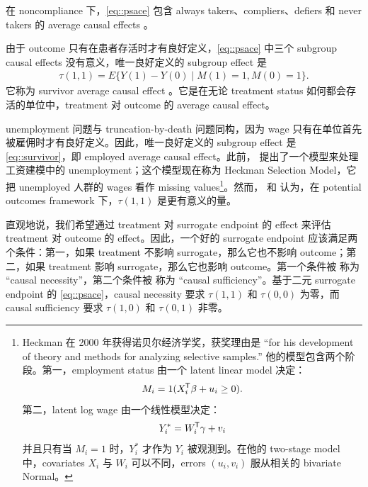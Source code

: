  

\setcounter{example}{0}
\begin{example}[noncompliance]
在 noncompliance 下，\cref{eq::psace} 包含 always takers、compliers、defiers 和 never takers 的 average causal effects \citep{imbens1994identification, angrist1996identification}。
\end{example}



\begin{example}
由于 outcome 只有在患者存活时才有良好定义，\cref{eq::psace} 中三个 subgroup causal effects 没有意义，唯一良好定义的 subgroup effect 是
\begin{eqnarray}
\label{eq::survivor}
\tau(1,1) = E\{  Y(1) - Y(0) \mid M(1) = 1, M(0) =1\} .
\end{eqnarray}
它称为 survivor average causal effect \citep{rubin2006causal}。它是在无论 treatment status 如何都会存活的单位中，treatment 对 outcome 的 average causal effect。
\end{example}



\begin{example}[unemployment]
unemployment 问题与 truncation-by-death 问题同构，因为 wage 只有在单位首先被雇佣时才有良好定义。因此，唯一良好定义的 subgroup effect 是 \cref{eq::survivor}，即 employed average causal effect。此前，\citet{heckman1979sample} 提出了一个模型来处理工资建模中的 unemployment；这个模型现在称为 Heckman Selection Model，它把 unemployed 人群的 wages 看作 missing values\footnote{Heckman 在 2000 年获得诺贝尔经济学奖，获奖理由是 ``for his development of theory and methods for analyzing selective samples.''
他的模型包含两个阶段。第一，employment status 由一个 latent linear model 决定：
$$
M_i = 1(X_i^{\mkern-1.5mu\mathsf{T}} \beta + u_i \geq 0).
$$
第二，latent log wage 由一个线性模型决定：
$$
Y_i^* = W_i^{\mkern-1.5mu\mathsf{T}} \gamma + v_i
$$
并且只有当 $M_i=1$ 时，$Y_i^*$ 才作为 $Y_i$ 被观测到。在他的 two-stage model 中，covariates $X_i$ 与 $W_i$ 可以不同，errors $(u_i,v_i)$ 服从相关的 bivariate Normal。
}。然而，\citet{zhang2003estimation} 和 \citet{zhang2009likelihood} 认为，在 potential outcomes framework 下，$\tau(1,1)$ 是更有意义的量。
\end{example} 



\begin{example}
直观地说，我们希望通过 treatment 对 surrogate endpoint 的 effect 来评估 treatment 对 outcome 的 effect。因此，一个好的 surrogate endpoint 应该满足两个条件：第一，如果 treatment 不影响 surrogate，那么它也不影响 outcome；第二，如果 treatment 影响 surrogate，那么它也影响 outcome。第一个条件被 \citet{frangakis2002principal} 称为 ``causal necessity''，第二个条件被 \citet{gilbert2008evaluating} 称为 ``causal sufficiency''。基于二元 surrogate endpoint 的 \cref{eq::psace}，causal necessity 要求 $\tau(1,1)$ 和 $\tau(0,0)$ 为零，而 causal sufficiency 要求 $\tau(1,0)$ 和 $\tau(0,1)$ 非零。
\end{example}





